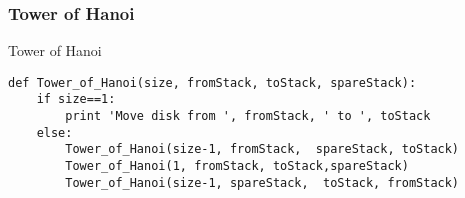 \documentclass{beamer}
\begin{document}
\begin{frame}[fragile]
\frametitle{Tower of Hanoi}
\begin{block}{Tower of Hanoi}
\tiny
\begin{verbatim}
def Tower_of_Hanoi(size, fromStack, toStack, spareStack):
    if size==1:
        print 'Move disk from ', fromStack, ' to ', toStack
    else:
        Tower_of_Hanoi(size-1, fromStack,  spareStack, toStack)
        Tower_of_Hanoi(1, fromStack, toStack,spareStack)
        Tower_of_Hanoi(size-1, spareStack,  toStack, fromStack)
\end{verbatim}
\end{block}
\end{frame}
\end{document}
